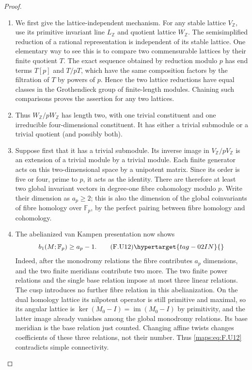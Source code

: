 \begin{proof}
\begin{enumerate}[label={$\langle1\rangle$\arabic*.}]
\item We first give the lattice-independent mechanism.  For any
stable lattice $V_\mathbb Z$, use its primitive invariant
line $L_\mathbb Z$ and quotient lattice $W_\mathbb Z$.
The semisimplified reduction of a rational representation is
independent of its stable lattice.  One elementary way to see
this is to compare two commensurable lattices by their finite
quotient $T$.  The exact sequence obtained by reduction modulo
$p$ has end terms $T[p]$ and $T/pT$, which have the same
composition factors by the filtration of $T$ by powers of $p$.
Hence the two lattice reductions have equal classes in the
Grothendieck group of finite-length modules.  Chaining such
comparisons proves the assertion for any two lattices.

\item Thus $W_\mathbb Z/pW_\mathbb Z$ has length two, with one
trivial constituent and one irreducible four-dimensional
constituent.  It has either a trivial submodule or a trivial
quotient (and possibly both).

\item Suppose first that it has a trivial submodule.  Its inverse
image in $V_\mathbb Z/pV_\mathbb Z$ is an extension of a
trivial module by a trivial module.  Each finite generator
acts on this two-dimensional space by a unipotent matrix.
Since its order is five or four, prime to $p$, it acts as
the identity.  There are therefore at least two global
invariant vectors in degree-one fibre cohomology modulo $p$.
Write their dimension as $a_p\ge2$; this is also the
dimension of the global coinvariants of fibre homology over
$\mathbb F_p$, by the perfect pairing between fibre homology
and cohomology.

\item The abelianized van Kampen presentation now shows
\[
 b_1(M;\mathbb F_p)\ge a_p-1.
 \tag{F.U12}\hypertarget{tag-02IN}{}\label{maps:eq:F.U12}
\]
Indeed, after the monodromy relations the fibre contributes
$a_p$ dimensions, and the two finite meridians contribute
two more.  The two finite power relations and the single
base relation impose at most three linear relations.
The cusp introduces no further fibre relation in this
abelianization.  On the dual homology lattice its nilpotent
operator is still primitive and maximal, so its angular lattice is
$\ker(M_0-I)=\operatorname{im}(M_0-I)$ by primitivity, and
the latter image already vanishes among the global
monodromy relations.  Its base meridian is the base relation
just counted.  Changing affine twists changes coefficients
of these three relations, not their number.  Thus \eqref{maps:eq:F.U12}
contradicts simple connectivity.


\end{enumerate}
\end{proof}
